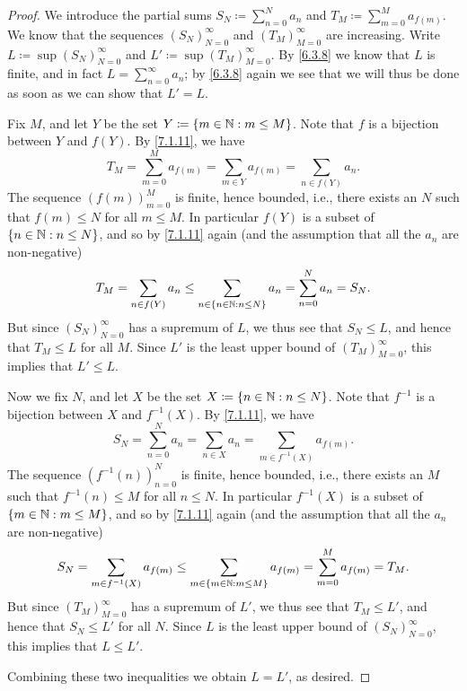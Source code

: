 \begin{proof}
  We introduce the partial sums \(S_N \coloneqq \sum_{n = 0}^N a_n\) and \(T_M \coloneqq \sum_{m = 0}^M a_{f(m)}\).
  We know that the sequences \((S_N)_{N = 0}^\infty\) and \((T_M)_{M = 0}^\infty\) are increasing.
  Write \(L \coloneqq \sup(S_N)_{N = 0}^\infty\) and \(L' \coloneqq \sup(T_M)_{M = 0}^\infty\).
  By \cref{6.3.8} we know that \(L\) is finite, and in fact \(L = \sum_{n = 0}^\infty a_n\);
  by \cref{6.3.8} again we see that we will thus be done as soon as we can show that \(L' = L\).

  Fix \(M\), and let \(Y\) be the set \(Y \coloneqq \{m \in \mathbb{N} : m \leq M\}\).
  Note that \(f\) is a bijection between \(Y\) and \(f(Y)\).
  By \cref{7.1.11}, we have
  \[
    T_M = \sum_{m = 0}^M a_{f(m)} = \sum_{m \in Y} a_{f(m)} = \sum_{n \in f(Y)} a_n.
  \]
  The sequence \((f(m))_{m = 0}^M\) is finite, hence bounded, i.e., there exists an \(N\) such that \(f(m) \leq N\) for all \(m \leq M\).
  In particular \(f(Y)\) is a subset of \(\{n \in \mathbb{N} : n \leq N\}\), and so by \cref{7.1.11} again (and the assumption that all the \(a_n\) are non-negative)
  \[
    T_M = \sum_{n \in f(Y)} a_n \leq \sum_{n \in \{n \in \mathbb{N} : n \leq N\}} a_n = \sum_{n = 0}^N a_n = S_N.
  \]
  But since \((S_N)_{N = 0}^\infty\) has a supremum of \(L\), we thus see that \(S_N \leq L\), and hence that \(T_M \leq L\) for all \(M\).
  Since \(L'\) is the least upper bound of \((T_M)_{M = 0}^\infty\), this implies that \(L' \leq L\).

  Now we fix \(N\), and let \(X\) be the set \(X \coloneqq \{n \in \mathbb{N} : n \leq N\}\).
  Note that \(f^{-1}\) is a bijection between \(X\) and \(f^{-1}(X)\).
  By \cref{7.1.11}, we have
  \[
    S_N = \sum_{n = 0}^N a_n = \sum_{n \in X} a_n = \sum_{m \in f^{-1}(X)} a_{f(m)}.
  \]
  The sequence \((f^{-1}(n))_{n = 0}^N\) is finite, hence bounded, i.e., there exists an \(M\) such that \(f^{-1}(n) \leq M\) for all \(n \leq N\).
  In particular \(f^{-1}(X)\) is a subset of \(\{m \in \mathbb{N} : m \leq M\}\), and so by \cref{7.1.11} again (and the assumption that all the \(a_n\) are non-negative)
  \[
    S_N = \sum_{m \in f^{-1}(X)} a_{f(m)} \leq \sum_{m \in \{m \in \mathbb{N} : m \leq M\}} a_{f(m)} = \sum_{m = 0}^M a_{f(m)} = T_M.
  \]
  But since \((T_M)_{M = 0}^\infty\) has a supremum of \(L'\), we thus see that \(T_M \leq L'\), and hence that \(S_N \leq L'\) for all \(N\).
  Since \(L\) is the least upper bound of \((S_N)_{N = 0}^\infty\), this implies that \(L \leq L'\).

  Combining these two inequalities we obtain \(L = L'\), as desired.
\end{proof}

